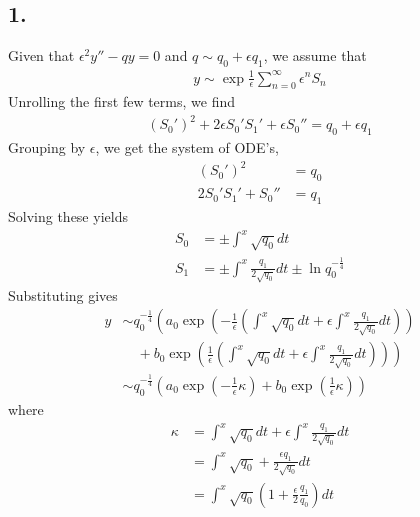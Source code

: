 \documentclass[12pt]{article}
\newcommand{\eq}[1]{\begin{align*}#1\end{align*}}
\begin{document}
\subsection*{1.}Given that $\epsilon^2 y'' - qy = 0$ and $q \sim q_0 + \epsilon q_1$, we assume that
\eq{
	y \sim \exp{\frac{1}{\epsilon}\sum_{n=0}^\infty \epsilon^n S_n}
}
Unrolling the first few terms, we find
\eq{
	(S_0')^2 + 2 \epsilon S_0'S_1' + \epsilon S_0'' = q_0 + \epsilon q_1
}
Grouping by $\epsilon$, we get the system of ODE's,
\eq{
	(S_0')^2 &= q_0\\
	2 S_0'S_1' + S_0'' &= q_1
}
Solving these yields
\eq{
	S_0 &= \pm \int^x \sqrt{q_0} dt\\
	S_1 &= \pm \int^x \frac{q_1}{2\sqrt{q_0}} dt \pm \ln q_0^{-\frac{1}{4}}
}
Substituting gives
\eq{
	y &\sim q_0^{-\frac{1}{4}}\left(a_0 \exp\left({-\frac{1}{\epsilon} \left(\int^x \sqrt{q_0} dt + \epsilon\int^x \frac{q_1}{2\sqrt{q_0}} dt\right)}\right)\right.\\
	 &\quad+ \left.b_0\exp\left({\frac{1}{\epsilon} \left(\int^x \sqrt{q_0} dt + \epsilon\int^x \frac{q_1}{2\sqrt{q_0}} dt\right)}\right)\right)\\
	&\sim q_0^{-\frac{1}{4}}\left(a_0 \exp\left({-\frac{1}{\epsilon} \kappa}\right) + b_0\exp\left({\frac{1}{\epsilon} \kappa}\right)\right)
}
where
\eq{
	\kappa &= \int^x \sqrt{q_0} dt + \epsilon\int^x \frac{q_1}{2\sqrt{q_0}} dt\\
	&= \int^x \sqrt{q_0} + \frac{\epsilon q_1}{2\sqrt{q_0}} dt\\
	&= \int^x \sqrt{q_0}\left(1 + \frac{\epsilon}{2}\frac{q_1}{q_0}\right) dt
}
\end{document}
